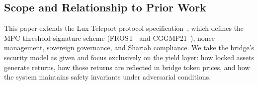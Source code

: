 \subsection{Scope and Relationship to Prior Work}

This paper extends the Lux Teleport protocol specification~\cite{luxteleport}, which defines the MPC threshold signature scheme (FROST~\cite{frost} and CGGMP21~\cite{cggmp21}), nonce management, sovereign governance, and Shariah compliance. We take the bridge's security model as given and focus exclusively on the yield layer: how locked assets generate returns, how those returns are reflected in bridge token prices, and how the system maintains safety invariants under adversarial conditions.


